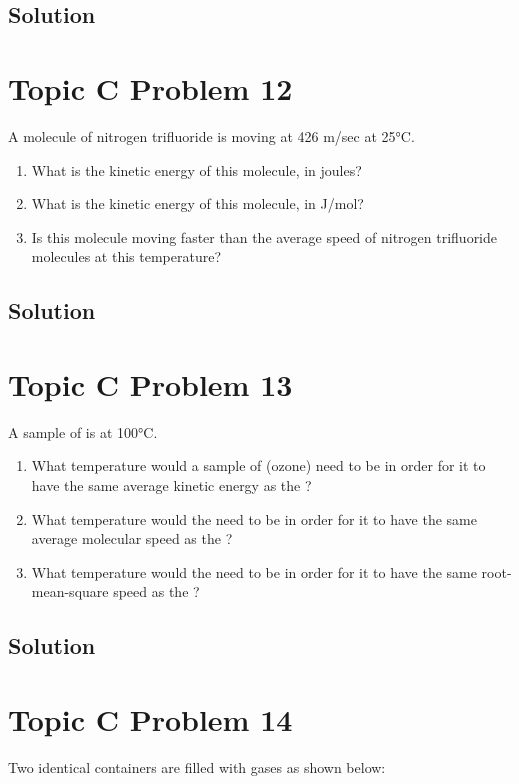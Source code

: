 \documentclass[10pt]{article}
\begin{document}
        \subsection{Solution}

    \pagebreak
    \section{Topic C Problem 12}
        A molecule of nitrogen trifluoride is moving at 426 m/sec at 25\unit{\celsius}.
        \begin{enumerate} [label=\alph*)]
            \item What is the kinetic energy of this molecule, in joules?
            \item What is the kinetic energy of this molecule, in J/mol?
            \item Is this molecule moving faster than the average speed of nitrogen trifluoride molecules at this temperature?
        \end{enumerate}

        \subsection{Solution}

    \pagebreak
    \section{Topic C Problem 13}
        A sample of  is at 100\unit{\celsius}.
        \begin{enumerate} [label=\alph*)]
            \item What temperature would a sample of  (ozone) need to be in order for it to have the same average kinetic energy as the ?
            \item What temperature would the  need to be in order for it to have the same average molecular speed as the ?
            \item What temperature would the  need to be in order for it to have the same root-mean-square speed as the ?
        \end{enumerate}

        \subsection{Solution}

    \pagebreak
    \section{Topic C Problem 14}
        Two identical containers are filled with gases as shown below:
        
\end{document}
